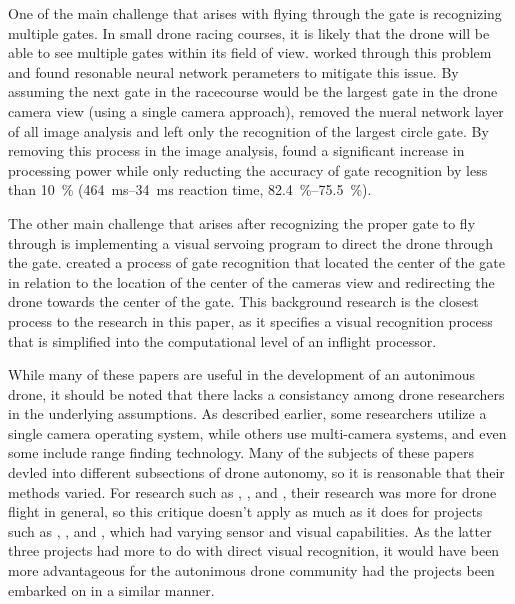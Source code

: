 \documentclass[onecolumn,10pt]{IEEEtran}
\begin{document}
One of the main challenge that arises with flying through the gate is recognizing multiple gates. In small drone racing courses, it is likely that the drone will be able to see multiple gates within its field of view. \cite{jung2018perception} worked through this problem and found resonable neural network perameters to mitigate this issue. By assuming the next gate in the racecourse would be the largest gate in the drone camera view (using a single camera approach), \cite{jung2018perception} removed the nueral network layer of all image analysis and left only the recognition of the largest circle gate. By removing this process in the image analysis, \cite{jung2018perception} found a significant increase in processing power while only reducting the accuracy of gate recognition by less than \SI{10}{\percent} (\SIrange{464}{34}{\milli\second} reaction time, \SIrange{82.4}{75.5}{\percent}).

The other main challenge that arises after recognizing the proper gate to fly through is implementing a visual servoing program to direct the drone through the gate. \cite{jung2018direct} created a process of gate recognition that located the center of the gate in relation to the location of the center of the cameras view and redirecting the drone towards the center of the gate. This background research is the closest process to the research in this paper, as it specifies a visual recognition process that is simplified into the computational level of an inflight processor.

While many of these papers are useful in the development of an autonimous drone, it should be noted that there lacks a consistancy among drone researchers in the underlying assumptions. As described earlier, some researchers utilize a single camera operating system, while others use multi-camera systems, and even some include range finding technology. Many of the subjects of these papers devled into different subsections of drone autonomy, so it is reasonable that their methods varied. For research such as \cite{svacha2017improving}, \cite{loianno2017estimation}, and \cite{florence2018nanomap}, their research was more for drone flight in general, so this critique doesn’t apply as much as it does for projects such as \cite{zhilenkov2018use}, \cite{jung2018perception}, and \cite{jung2018direct}, which had varying sensor and visual capabilities. As the latter three projects had more to do with direct visual recognition, it would have been more advantageous for the autonimous drone community had the projects been embarked on in a similar manner.
\end{document}
